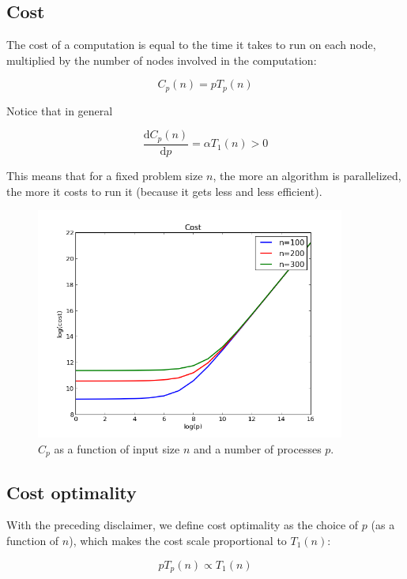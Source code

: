 \documentclass[justified,sixbynine]{tufte-book}
\theoremstyle{plain}%
\theoremstyle{definition}
\theoremstyle{remark}
\begin{document}
\begin{fullwidth}
\goodbreak\subsection{Cost}

The cost of a computation is equal to the time it takes to run on each node, multiplied by the number of nodes involved in the computation:

\begin{equation}
C_p(n) = p T_p(n)
\end{equation}

Notice that in general

\begin{equation}
\frac{\textrm{d}C_p(n)}{\textrm{d}p} = \alpha T_1(n) > 0
\end{equation}

This means that for a fixed problem size $n$, the more an algorithm is parallelized, the more it costs to run it (because it gets less and less efficient).

\begin{figure}[ht]
\centering\includegraphics[width=4in]{images/Cp.png}
\caption{$C_p$ as a function of input size $n$ and a number of processes $p$.\label{Cp}}
\end{figure}

\goodbreak\subsection{Cost optimality}

With the preceding disclaimer, we define cost optimality as the choice of $p$ (as a function of $n$), which makes the cost scale proportional to $T_1(n)$:

\begin{equation}
p T_p(n) \propto T_1(n)
\end{equation}


\end{fullwidth}
\end{document}
